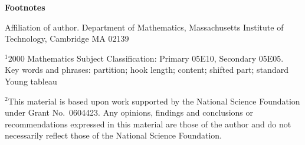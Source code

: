 \documentclass[12pt]{article}
\theoremstyle{definition}
\theoremstyle{remark}
\begin{document}
\pagebreak
\begin{center}
{\large\bf Footnotes}\\[.5in]
\end{center}

Affiliation of author. Department of Mathematics, Massachusetts
Institute of Technology, Cambridge MA 02139

\medskip
$^1$2000 Mathematics Subject Classification: Primary 05E10, Secondary
05E05.  \\Key words and phrases: partition; hook length; content;
shifted part; standard Young tableau

\medskip
$^2$This material is based upon work supported by the
  National Science Foundation under Grant No.~0604423. Any opinions,
  findings and conclusions or recommendations expressed in this
  material are those of the author and do not necessarily reflect
  those of the National Science Foundation.

 
\end{document}
